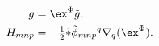 \begin{equation}
\label{confg2}
\begin{aligned}
   g &= \ex^{\Phi}\tilde g , \\
   H_{mnp} &= -\tfrac{1}{2}\tilde *\tilde\phi_{mnp}{}^q
      \nabla_q(\ex^{\Phi}) .
\end{aligned}   
\end{equation}

